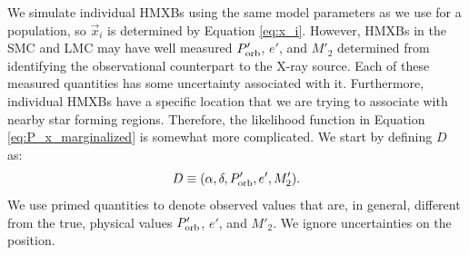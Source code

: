 \documentclass[12pt, preprint]{aastex}
\newcommand{\given}{\,|\,}
\begin{document}



















We simulate individual HMXBs using the same model parameters as we use for a population, so $\vec{x}_i$ is determined by Equation \ref{eq:x_i}. However, HMXBs in the SMC and LMC may have well measured $P'_{\rm orb}$, $e'$, and $M'_2$ determined from identifying the observational counterpart to the X-ray source. Each of these measured quantities has some uncertainty associated with it. Furthermore, individual HMXBs have a specific location that we are trying to associate with nearby star forming regions. Therefore, the likelihood function in Equation \ref{eq:P_x_marginalized} is somewhat more complicated. We start by defining $D$ as:
\begin{equation}
D \equiv (\alpha, \delta, P'_{\rm orb}, e', M'_2). \label{eq:D}
\end{equation}
We use primed quantities to denote observed values that are, in general, different from the true, physical values $P'_{\rm orb}$, $e'$, and $M'_2$. We ignore uncertainties on the position.
\end{document}
